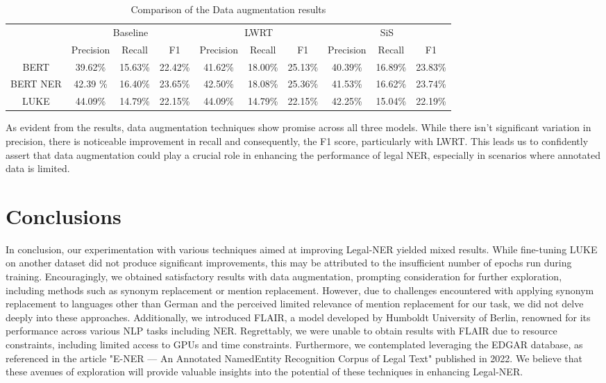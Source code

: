 \documentclass{article}
\begin{document}
\begin{table}[h]
    \centering
    \begin{tabular}{||c|| c | c | c || c |c | c || c | c |c||} 

 \hline
 \multirow{2}{6em}{\centering{Models}}  & \multicolumn{3}{|c||}{Baseline} & \multicolumn{3}{|c||}{LWRT} &\multicolumn{3}{|c||}{SiS}\\
  & Precision & Recall & F1 & Precision & Recall & F1& Precision & Recall & F1\\
 \hline
    BERT  &   39.62\% & 15.63\% & 22.42\% & 41.62\%& 18.00\%&25.13\% & 40.39\%&16.89\%&23.83\%\\
    \hline
    BERT NER     & 42.39 \% & 16.40\% & 23.65\% & 42.50\% & 18.08\% & 25.36\% &41.53\% &16.62\% &23.74\%\\
    \hline
    LUKE & 44.09\% & 14.79\%& 22.15\%& 44.09\%& 14.79\%&22.15\%&42.25\%&15.04\%&22.19\%\\
    \hline
    \end{tabular}
    \caption{Comparison of the Data augmentation results}
    \label{tab:Data-augmentation}
\end{table}


As evident from the results, data augmentation techniques show promise across all three models. While there isn't significant variation in precision, there is noticeable improvement in recall and consequently, the F1 score, particularly with LWRT. This leads us to confidently assert that data augmentation could play a crucial role in enhancing the performance of legal NER, especially in scenarios where annotated data is limited.


\section{Conclusions}

In conclusion, our experimentation with various techniques aimed at improving Legal-NER yielded mixed results. While fine-tuning LUKE on another dataset did not produce significant improvements, this may be attributed to the insufficient number of epochs run during training. Encouragingly, we obtained satisfactory results with data augmentation, prompting consideration for further exploration, including methods such as synonym replacement or mention replacement. However, due to challenges encountered with applying synonym replacement to languages other than German and the perceived limited relevance of mention replacement for our task, we did not delve deeply into these approaches. Additionally, we introduced FLAIR, a model developed by Humboldt University of Berlin, renowned for its performance across various NLP tasks including NER. Regrettably, we were unable to obtain results with FLAIR due to resource constraints, including limited access to GPUs and time constraints. Furthermore, we contemplated leveraging the EDGAR database, as referenced in the article "E-NER — An Annotated NamedEntity Recognition Corpus of Legal Text" \cite{E-NER} published in 2022. We believe that these avenues of exploration will provide valuable insights into the potential of these techniques in enhancing Legal-NER.
\end{document}

